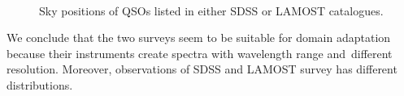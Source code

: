 \begin{figure}
\\
\caption[Sky position of quasars of SDSS and LAMOST]{
	Sky positions of QSOs listed in either SDSS or LAMOST catalogues.
}
\label{qso_coverage}
\end{figure}

We conclude that the two surveys seem to be suitable for domain adaptation
because their instruments create spectra with wavelength range and~different resolution.
Moreover, observations of SDSS and LAMOST survey has different distributions.

